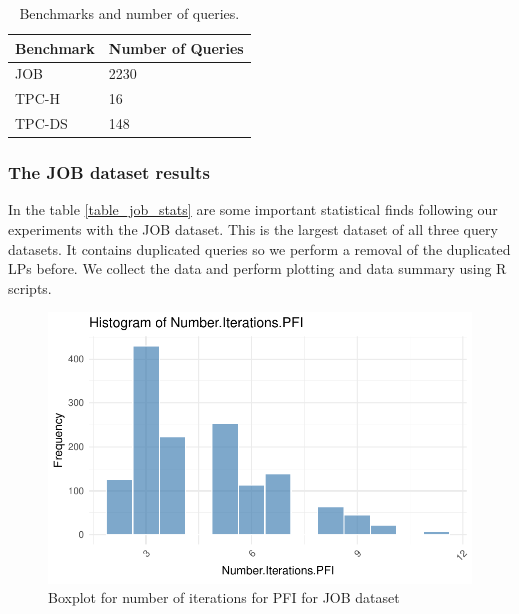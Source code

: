 \begin{table}[!htb]
    \centering
    \caption{Benchmarks and number of queries.}
    \begin{tabular}{|l|l|}
        \hline
        Benchmark                                & Number of Queries \\
        \hline
        JOB \parencite{10.14778/2850583.2850594} & 2230              \\
        TPC-H \parencite{tpch}                   & 16                \\
        TPC-DS \parencite{tpcds2022}             & 148               \\
        \hline
    \end{tabular}
    \label{job_tpch_tpcds}
\end{table}

\subsubsection{The JOB dataset results}
In the table \ref{table_job_stats} are some important statistical finds following our
experiments with the JOB dataset.
This is the largest dataset of all three query datasets. It contains duplicated queries so we
perform a removal of the duplicated LPs before. We collect the data and perform plotting and data summary
using R scripts.

\begin{figure}[!htb]
    \centering
    \includegraphics[width=\textwidth]{figures/histo_iter_pfi.pdf}
    \caption{Boxplot for number of iterations for PFI for JOB dataset}
    \label{fig:num_iter_boxplot_pfi_job}
\end{figure}

